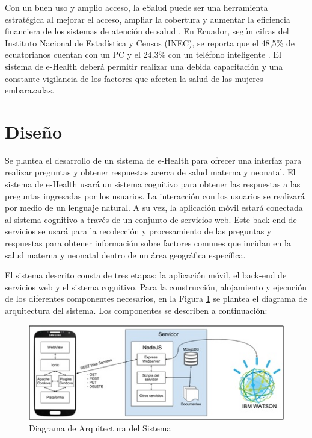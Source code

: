 \documentclass[12pt]{article}
\begin{document}
Con un buen uso y amplio acceso, la eSalud puede ser una herramienta estratégica al mejorar el acceso, ampliar la cobertura y aumentar la eficiencia financiera de los sistemas de atención de salud \cite{ops2014}. En Ecuador, según cifras del Instituto Nacional de Estadística y Censos (INEC), se reporta que el 48,5\% de ecuatorianos cuentan con un PC y el 24,3\% con un teléfono inteligente \cite{inec2014}. El sistema de e-Health deberá permitir realizar una debida capacitación y una constante vigilancia de los factores que afecten la salud de las mujeres embarazadas.

\section{Diseño}
\label{sec:diseno}

Se plantea el desarrollo de un sistema de e-Health para ofrecer una interfaz para realizar preguntas y obtener respuestas acerca de salud materna y neonatal. El sistema de e-Health usará un sistema cognitivo para obtener las respuestas a las preguntas ingresadas por los usuarios. La interacción con los usuarios se realizará por medio de un lenguaje natural. A su vez, la aplicación móvil estará conectada al sistema cognitivo a través de un conjunto de servicios web. Este back-end de servicios se usará para la recolección y procesamiento de las preguntas y respuestas para obtener información sobre factores comunes que incidan en la salud materna y neonatal dentro de un área geográfica específica.

El sistema descrito consta de tres etapas: la aplicación móvil, el back-end de servicios web y el sistema cognitivo. Para la construcción, alojamiento y ejecución de los diferentes componentes necesarios, en la Figura \ref{fig:arquitectura} se plantea el diagrama de arquitectura del sistema. Los componentes se describen a continuación:

\begin{figure}[ht]
\centering
\includegraphics[width=.75\textwidth]{model.jpg}
\caption{Diagrama de Arquitectura del Sistema}
\label{fig:arquitectura}
\end{figure}
\end{document}
